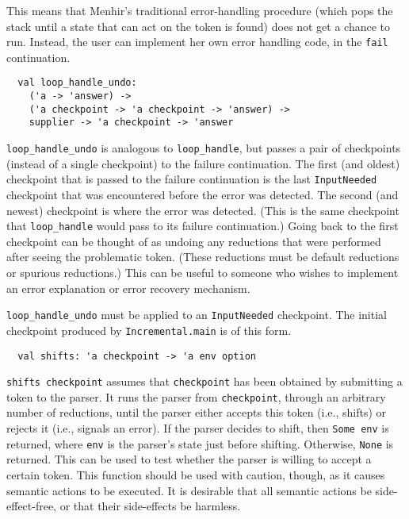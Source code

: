 \documentclass[onecolumn,11pt,nocopyrightspace,preprint]{sigplanconf}
\begin{document}
This means that Menhir's traditional error-handling procedure (which pops the
stack until a state that can act on the \error token is found) does not get a
chance to run. Instead, the user can implement her own error handling code, in
the \verb+fail+ continuation.


\begin{verbatim}
  val loop_handle_undo:
    ('a -> 'answer) ->
    ('a checkpoint -> 'a checkpoint -> 'answer) ->
    supplier -> 'a checkpoint -> 'answer
\end{verbatim}

\verb+loop_handle_undo+ is analogous to \verb+loop_handle+, but passes a pair
of checkpoints (instead of a single checkpoint) to the failure continuation.
%
The first (and oldest) checkpoint that is passed to the failure continuation
is the last \verb+InputNeeded+ checkpoint that was encountered before the
error was detected. The second (and newest) checkpoint is where the error was
detected. (This is the same checkpoint that \verb+loop_handle+ would pass to
its failure continuation.) Going back to the first checkpoint can be thought
of as undoing any reductions that were performed after seeing the problematic
token. (These reductions must be default reductions or spurious reductions.)
This can be useful to someone who wishes to implement an error explanation or
error recovery mechanism.

\verb+loop_handle_undo+ must be applied to an \verb+InputNeeded+ checkpoint.
The initial checkpoint produced by \verb+Incremental.main+ is of this form.


\begin{verbatim}
  val shifts: 'a checkpoint -> 'a env option
\end{verbatim}

\verb+shifts checkpoint+ assumes that \verb+checkpoint+ has been obtained by
submitting a token to the parser. It runs the parser from \verb+checkpoint+,
through an arbitrary number of reductions, until the parser either accepts
this token (i.e., shifts) or rejects it (i.e., signals an error). If the
parser decides to shift, then \verb+Some env+ is returned, where \verb+env+ is
the parser's state just before shifting. Otherwise, \verb+None+ is returned.
This can be used to test whether the parser is willing to accept a certain
token. This function should be used with caution, though, as it causes
semantic actions to be executed. It is desirable that all semantic actions be
side-effect-free, or that their side-effects be harmless.
\end{document}
